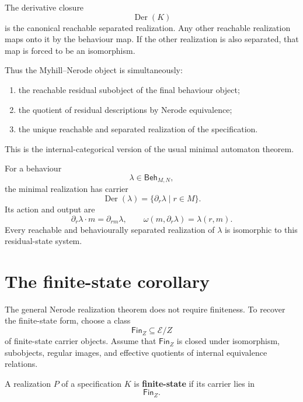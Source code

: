 \begin{remark}
\label{rem:internal-myhill-nerode-principle}
The derivative closure
\[
\operatorname{Der}(K)
\]
is the canonical reachable separated realization. Any other reachable
realization maps onto it by the behaviour map. If the other realization is
also separated, that map is forced to be an isomorphism.

Thus the Myhill--Nerode object is simultaneously:
\begin{enumerate}
\item the reachable residual subobject of the final behaviour object;
\item the quotient of residual descriptions by Nerode equivalence;
\item the unique reachable and separated realization of the specification.
\end{enumerate}
This is the internal-categorical version of the usual minimal automaton
theorem.
\end{remark}

\begin{example}
\label{ex:monoid-minimal-realization}
For a behaviour
\[
\lambda\in\mathsf{Beh}_{M,N},
\]
the minimal realization has carrier
\[
\operatorname{Der}(\lambda)
=
\{\partial_r\lambda\mid r\in M\}.
\]
Its action and output are
\[
\partial_r\lambda\cdot m=\partial_{rm}\lambda,
\qquad
\omega(m,\partial_r\lambda)=\lambda(r,m).
\]
Every reachable and behaviourally separated realization of \(\lambda\) is
isomorphic to this residual-state system.
\end{example}

\section{The finite-state corollary}
\label{sec:finite-state-corollary}

The general Nerode realization theorem does not require finiteness. To recover
the finite-state form, choose a class
\[
\mathsf{Fin}_Z\subseteq\mathcal E/Z
\]
of finite-state carrier objects. Assume that \(\mathsf{Fin}_Z\) is closed
under isomorphism, subobjects, regular images, and effective quotients of
internal equivalence relations.

\begin{definition}
\label{def:finite-state-realization}
A realization \(P\) of a specification \(K\) is \textbf{finite-state} if its
carrier lies in
\[
\mathsf{Fin}_Z.
\]
\end{definition}


